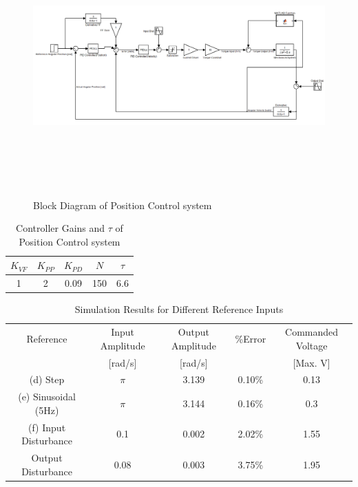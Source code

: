 \documentclass{article}
\theoremstyle{plain}
\theoremstyle{definition}
\theoremstyle{remark}
\begin{document}
\begin{figure}[htb]
\begin{center}
\includegraphics[height = 10cm, width = 16 cm]{q3_17}
\caption{Block Diagram of Position Control system}
\label{q3_17}
\end{center}
\end{figure}

\begin{table}[htb]
\begin{center}
    \begin{tabular}{|c|c|c|c|c|}
        \hline
        $K_{VF}$ & $K_{PP}$ & $K_{PD}$ & $N$ & $\tau$ \\ \hline
        1        & 2        & 0.09     & 150 & 6.6    \\
        \hline
    \end{tabular}
\caption{Controller Gains and $\tau$ of Position Control system}
\end{center}
\end{table}


\begin{table}
\begin{center}
    \begin{tabular}{|c|c|c|c|c|}
        \hline
        Reference               & Input Amplitude  & Output Amplitude  & \%Error & Commanded Voltage  \\ 
        ~                       & [rad/s]          & [rad/s]           & ~       & [Max. V]           \\ \hline
        (d) Step                & $\pi$              & 3.139             & 0.10\%  & 0.13               \\ 
        (e) Sinusoidal (5Hz)          & $\pi$              & 3.144             & 0.16\%  & 0.3                \\ 
        (f) Input Disturbance   & 0.1              & 0.002             & 2.02\%  & 1.55               \\ 
             Output Disturbance & 0.08             & 0.003             & 3.75\%  & 1.95               \\
        \hline
    \end{tabular}
\caption{Simulation Results for Different Reference Inputs}
\end{center}
\end{table}
\end{document}
